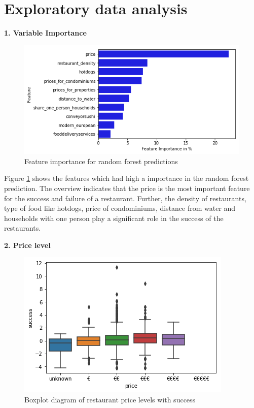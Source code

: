 \documentclass[a4paper, 11pt, oneside]{Thesis}  %
\begin{document}
\section{Exploratory data analysis}
\label{Exploratory_data_analysis}

\textbf{1.	Variable Importance}

\begin{figure}[h]
\includegraphics[scale=0.7]{Figures/Exploratory/feature_importance_barplot.png}
\centering
\caption{Feature importance for random forest predictions}
\label{fig:feature_importance_barplot}
\end{figure}

Figure \ref{fig:feature_importance_barplot} shows the features which had high a importance in the random forest prediction. The overview indicates that the price is the most important feature for the success and failure of a restaurant. Further, the density of restaurants, type of food like hotdogs, price of condominiums, distance from water and households with one person play a significant role in the success of the restaurants.

\textbf{2.	Price level}

\begin{figure}[h]
\includegraphics[scale=0.7]{Figures/Exploratory/boxplot_price_levels.png}
\centering
\caption{Boxplot diagram of restaurant price levels with success}
\label{fig:boxplot_price_levels}
\end{figure}
\end{document}
